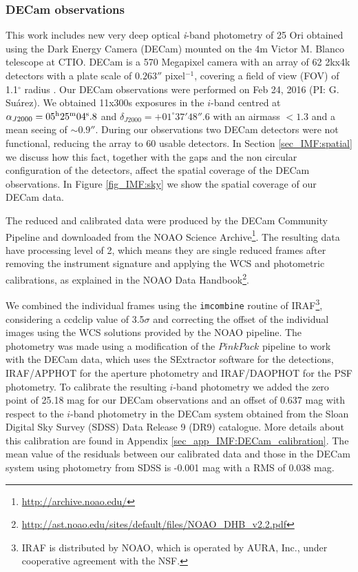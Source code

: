 \documentclass[12pt]{article}
\begin{document}
\subsubsection{DECam observations}
\label{sec_IMF:DECam}

This work includes new very deep optical \textit{i}-band photometry of 25 Ori obtained using the Dark Energy Camera (\ac{DECam}) mounted on the 4m Victor M. Blanco telescope at CTIO. DECam is a 570 Megapixel camera with an array of 62 2kx4k detectors with a plate scale of $0.263''$ pixel$^{-1}$, covering a field of view (\ac{FOV}) of 1.1$^\circ$ radius \citep{Flaugher2015}. Our DECam observations were performed on Feb 24, 2016 (PI: G. Su\'arez). We obtained 11x300s exposures in the $i$-band centred at $\alpha_{J2000}= 05^{\rm h} 25^{\rm m} 04^{\rm s}.8$ and $\delta_{J2000} = +01^{\circ} 37' 48''.6$ with an airmass $<1.3$ and a mean seeing of $\sim 0.9''$. During our observations two DECam detectors were not functional, reducing the array to 60 usable detectors. In Section \ref{sec_IMF:spatial} we discuss how this fact, together with the gaps and the non circular configuration of the detectors, affect the spatial coverage of the DECam observations. In Figure \ref{fig_IMF:sky} we show the spatial coverage of our DECam data.

The reduced and calibrated data were produced by the DECam Community Pipeline \citep{Valdes2014} and downloaded from the NOAO Science Archive\footnote{\url{http://archive.noao.edu/}}. The resulting data have processing level of 2, which means they are single reduced frames after removing the instrument signature and applying the WCS and photometric calibrations, as explained in the NOAO Data Handbook\footnote{\url{http://ast.noao.edu/sites/default/files/NOAO\_DHB\_v2.2.pdf}}.

We combined the individual frames using the \texttt{imcombine} routine of IRAF\footnote{IRAF is distributed by NOAO, which is operated by AURA, Inc., under cooperative agreement with the NSF.}, considering a ccdclip value of 3.5$\sigma$ and correcting the offset of the individual images using the WCS solutions provided by the NOAO pipeline. The photometry was made using a modification of the $PinkPack$ pipeline \citep{Levine2006} to work with the DECam data, which uses the SExtractor software \citep{Bertin-Arnouts1996} for the detections, IRAF/APPHOT for the aperture photometry and IRAF/DAOPHOT for the PSF photometry. To calibrate the resulting $i$-band photometry we added the zero point of 25.18 mag for our DECam observations and an offset of 0.637 mag with respect to the $i$-band photometry in the DECam system obtained from the Sloan Digital Sky Survey (\ac{SDSS}) Data Release 9 (DR9) \citep{Ahn2012} catalogue. More details about this calibration are found in Appendix \ref{sec_app_IMF:DECam_calibration}. The mean value of the residuals between our calibrated data and those in the DECam system using photometry from SDSS is -0.001 mag with a RMS of 0.038 mag.
\end{document}
